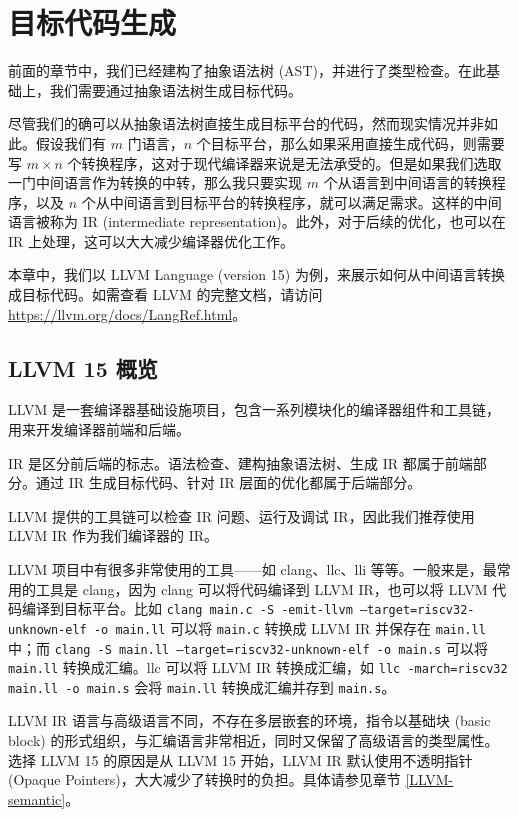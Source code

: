 \chapter{目标代码生成}

前面的章节中，我们已经建构了抽象语法树 (AST)，并进行了类型检查。在此基础上，我们需要通过抽象语法树生成目标代码。

尽管我们的确可以从抽象语法树直接生成目标平台的代码，然而现实情况并非如此。假设我们有
$m$ 门语言，$n$ 个目标平台，那么如果采用直接生成代码，则需要写 $m\times n$
个转换程序，这对于现代编译器来说是无法承受的。但是如果我们选取一门中间语言作为转换的中转，那么我只要实现
$m$ 个从语言到中间语言的转换程序，以及 $n$ 个从中间语言到目标平台的转换程序，就可以满足需求。这样的中间语言被称为
IR (intermediate representation)。此外，对于后续的优化，也可以在 IR 上处理，这可以大大减少编译器优化工作。

本章中，我们以 LLVM Language (version 15) 为例，来展示如何从中间语言转换成目标代码。如需查看
LLVM 的完整文档，请访问 \url{https://llvm.org/docs/LangRef.html}。

\section{LLVM 15 概览}

LLVM 是一套编译器基础设施项目，包含一系列模块化的编译器组件和工具链，用来开发编译器前端和后端。

IR 是区分前后端的标志。语法检查、建构抽象语法树、生成 IR 都属于前端部分。通过 IR
生成目标代码、针对 IR 层面的优化都属于后端部分。

LLVM 提供的工具链可以检查 IR 问题、运行及调试 IR，因此我们推荐使用 LLVM IR
作为我们编译器的 IR。

LLVM 项目中有很多非常使用的工具——如 clang、llc、lli 等等。一般来是，最常用的工具是
clang，因为 clang 可以将代码编译到 LLVM IR，也可以将 LLVM 代码编译到目标平台。比如
\texttt{clang main.c -S -emit-llvm --target=riscv32-unknown-elf -o main.ll}
可以将 \texttt{main.c} 转换成 LLVM IR 并保存在 \texttt{main.ll} 中；而
\texttt{clang -S main.ll --target=riscv32-unknown-elf -o main.s}
可以将 \texttt{main.ll} 转换成汇编。llc 可以将 LLVM IR 转换成汇编，如
\texttt{llc -march=riscv32 main.ll -o main.s} 会将 \texttt{main.ll}
转换成汇编并存到 \texttt{main.s}。

LLVM IR 语言与高级语言不同，不存在多层嵌套的环境，指令以基础块 (basic block)
的形式组织，与汇编语言非常相近，同时又保留了高级语言的类型属性。选择 LLVM 15
的原因是从 LLVM 15 开始，LLVM IR 默认使用不透明指针
(Opaque Pointers)，大大减少了转换时的负担。具体请参见章节 \ref{LLVM-semantic}。

